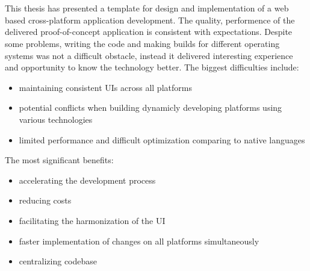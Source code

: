 
\chapter{}%
\label{ch:conclusie}


This thesis has presented a template for design and implementation of a web based cross-platform application development. The quality, performence of the delivered proof-of-concept application is consistent with expectations. 
Despite some problems, writing the code and making builds for different operating systems was not a difficult obstacle, instead it delivered interesting experience and opportunity to know the technology better.
\newline
The biggest difficulties include:
\begin{itemize}
    \item maintaining consistent UIs across all platforms
    \item potential conflicts when building dynamicly developing platforms using various technologies
    \item limited performance and difficult optimization comparing to native languages
\end{itemize}

The most significant benefits:
\begin{itemize}
    \item accelerating the development process
    \item reducing costs
    \item facilitating the harmonization of the UI
    \item faster implementation of changes on all platforms simultaneously
    \item centralizing codebase
\end{itemize}

